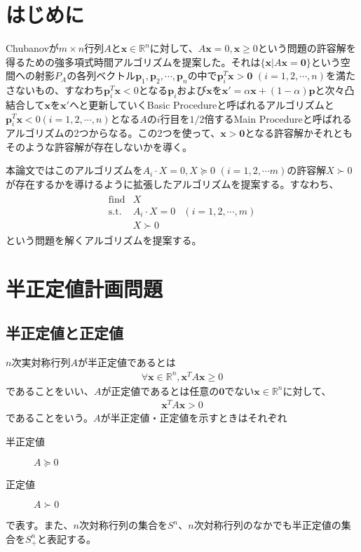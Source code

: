 \section{はじめに}
Chubanovが$m \times n$行列$A$と$\mathbf{x} \in \mathbb{R}^n$に対して、$A \mathbf{x} = 0, \mathbf{x} \geq 0$という問題の許容解を得るための強多項式時間アルゴリズムを提案した。それは$\{\mathbf{x} | A \mathbf{x} = \mathbf{0}\}$という空間への射影$P_A$の各列ベクトル$\mathbf{p}_1, \mathbf{p}_2, \cdots, \mathbf{p}_n$の中で$\mathbf{p}_i^T \mathbf{x} > \mathbf{0} \,\, (i = 1, 2, \cdots, n)$を満たさないもの、すなわち$\mathbf{p}_i^T \mathbf{x} < 0$となる$\mathbf{p}_i$および$\mathbf{x}$を$\mathbf{x}' = \alpha \mathbf{x} + (1 - \alpha) \mathbf{p}$と次々凸結合して$\mathbf{x}$を$\mathbf{x}'$へと更新していくBasic Procedureと呼ばれるアルゴリズムと$\mathbf{p}_i^T \mathbf{x} < 0 (i = 1, 2, \cdots, n)$となる$A$の$i$行目を$1 / 2$倍するMain Procedureと呼ばれるアルゴリズムの2つからなる。この2つを使って、$\mathbf{x} > \mathbf{0}$となる許容解かそれともそのような許容解が存在しないかを導く。

本論文ではこのアルゴリズムを$A_i \cdot X = 0, X \succeq 0 \,\, (i = 1, 2, \cdots m)$の許容解$X \succ 0$が存在するかを導けるように拡張したアルゴリズムを提案する。すなわち、
\begin{align}
  \begin{array}{lll}
    \mathrm{find} & X \\
    \mathrm{s.t.} & A_i \cdot X = 0 & (i = 1, 2, \cdots, m) \\
                  & X \succ 0
  \end{array}
\end{align} \label{SDP}
という問題を解くアルゴリズムを提案する。

\section{半正定値計画問題}
\subsection{半正定値と正定値}
$n$次実対称行列$A$が半正定値であるとは
\begin{align} \label{PSD}
  \forall \mathbf{x} \in \mathbb{R}^n, \mathbf{x}^T A \mathbf{x} \geq 0
\end{align}
であることをいい、$A$が正定値であるとは任意の$\mathbf{0}$でない$\mathbf{x} \in \mathbb{R}^n$に対して、
\begin{align} \label{PD}
  \mathbf{x}^T A \mathbf{x} > 0
\end{align}
であることをいう。$A$が半正定値・正定値を示すときはそれぞれ
\begin{description}
  \item[半正定値] $A \succeq 0$
  \item[正定値]   $A \succ 0$
\end{description}
で表す。また、$n$次対称行列の集合を$S^n$、$n$次対称行列のなかでも半正定値の集合を$S_+^n$と表記する。


